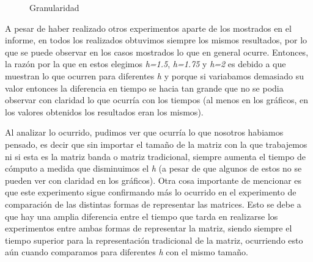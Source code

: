 \documentclass[10pt, a4paper]{article}
\begin{document}
\begin{figure}[H]
\centering
	\caption{Granularidad} 
\end{figure}

A pesar de haber realizado otros experimentos aparte de los mostrados en el informe, en todos los realizados obtuvimos siempre los mismos resultados, por lo que se puede observar en los casos mostrados lo que en general ocurre. Entonces, la raz\'on por la que en estos elegimos \textit{h=1.5}, \textit{h=1.75} y \textit{h=2} es debido a que muestran lo que ocurren para diferentes \textit{h} y porque si variabamos demasiado su valor entonces la diferencia en tiempo se hacia tan grande que no se podia observar con claridad lo que ocurr\'ia con los tiempos (al menos en los gr\'aficos, en los valores obtenidos los resultados eran los mismos).

Al analizar lo ocurrido, pudimos ver que ocurr\'ia lo que nosotros habiamos pensado, es decir que sin importar el tamaño de la matriz con la que trabajemos ni si esta es la matriz banda o matriz tradicional, siempre aumenta el tiempo de c\'omputo a medida que disminuimos el \textit{h} (a pesar de que algunos de estos no se pueden ver con claridad en los gr\'aficos). Otra cosa importante de mencionar es que este experimento sigue confirmando m\'as lo ocurrido en el experimento de comparaci\'on de las distintas formas de representar las matrices. Esto se debe a que hay una amplia diferencia entre el tiempo que tarda en realizarse los experimentos entre ambas formas de representar la matriz, siendo siempre el tiempo superior para la representaci\'on tradicional de la matriz, ocurriendo esto a\'un cuando comparamos para diferentes \textit{h} con el mismo tamaño.
\end{document}
